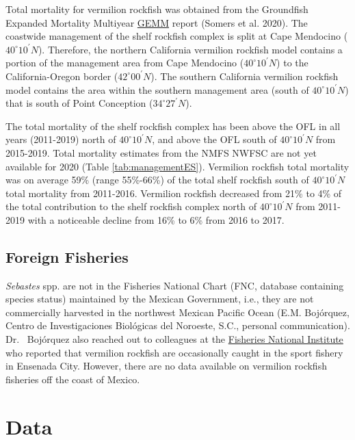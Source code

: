 \documentclass[
  english,
  a4paper,
]{article}
\begin{document}
Total mortality for vermilion rockfish was obtained from the Groundfish Expanded Mortality
Multiyear \href{https://www.nwfsc.noaa.gov/data/api/v1/source/observer.gemm_fact/selection.xlsx}{GEMM}
report (Somers et al. 2020). The coastwide management of the shelf rockfish complex is split at Cape
Mendocino ($40^\circ 10^\prime N$). Therefore, the northern California vermilion rockfish
model contains a portion of the management area from Cape Mendocino ($40^\circ 10^\prime N$)
to the California-Oregon border ($42^\circ 00^\prime N$). The southern California vermilion rockfish model contains the
area within the southern management area (south of $40^\circ 10^\prime N$) that is south of Point Conception ($34^\circ 27^\prime N$).

The total mortality of the shelf rockfish complex has been above the OFL in all years (2011-2019) north of $40^\circ 10^\prime N$, and
above the OFL south of $40^\circ 10^\prime N$ from 2015-2019. Total mortality
estimates from the NMFS NWFSC are not yet available for 2020 (Table \ref{tab:managementES}). Vermilion rockfish total
mortality was on average 59\% (range 55\%-66\%) of the total shelf rockfish south
of $40^\circ 10^\prime N$ total mortality from 2011-2016. Vermilion rockfish decreased from 21\% to 4\% of
the total contribution to the shelf rockfish complex north of $40^\circ 10^\prime N$ from 2011-2019 with a
noticeable decline from 16\% to 6\% from 2016 to 2017.

\hypertarget{foreign-fisheries}{%
\subsection{Foreign Fisheries}\label{foreign-fisheries}}

\emph{Sebastes} spp. are not in the Fisheries National Chart (FNC, database containing
species status) maintained by the Mexican Government, i.e., they are not commercially
harvested in the northwest Mexican Pacific Ocean (E.M. Bojórquez, Centro de
Investigaciones Biológicas del Noroeste, S.C., personal communication). Dr.~
Bojórquez also reached out to colleagues at the
\href{https://www.gob.mx/inapesca}{Fisheries National Institute} who reported that
vermilion rockfish are occasionally caught in the sport fishery in Ensenada City.
However, there are no data available on vermilion rockfish fisheries off the coast
of Mexico.

\hypertarget{data}{%
\section{Data}\label{data}}
\end{document}
